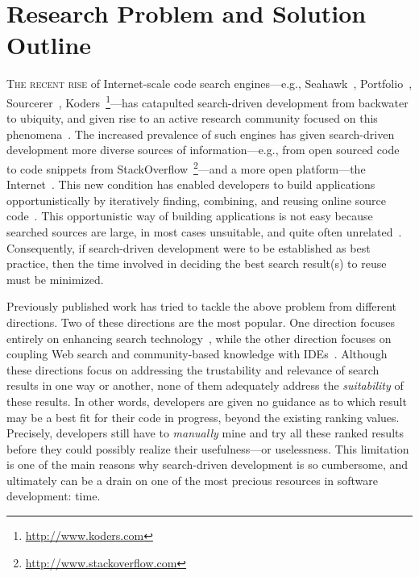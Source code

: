 \documentclass[conference]{IEEEtran}
\begin{document}
\section{Research Problem and Solution Outline}
\label{sec:intro}
\lettrine[lraise=0.1, nindent=0em, slope=-.5em]{T} {he recent rise} of Internet-scale code search engines---e.g., Seahawk~\cite{Bacchelli:2012dl}, Portfolio~\cite{McMillan:2011wq}, Sourcerer~\cite{Bajracharya:2006vn}, Koders~\footnote{\url{http://www.koders.com}}---has catapulted search-driven development from backwater to ubiquity, and given rise to an active research community focused on this phenomena~\cite{Bajracharya:2009fj, Bajracharya:2010iy, Bajracharya:2011kw}. The increased prevalence of such engines has given search-driven development more diverse sources of information---e.g., from open sourced code to code snippets from StackOverflow~\footnote{\url{http://www.stackoverflow.com}}---and a more open platform---the Internet~\cite{GallardoValencia:2009gr, GallardoValencia:2010ij, Ying:2012tr}. This new condition has enabled developers to build applications opportunistically by iteratively finding, combining, and reusing online source code~\cite{Brandt:2008wi, Brandt:2009jb, Ying:2012tr}. This opportunistic way of building applications is not easy because searched sources are large, in most cases unsuitable, and quite often unrelated~\cite{GallardoValencia:2009gr}. Consequently, if search-driven development were to be established as best practice, then the time involved in deciding the best search result(s) to reuse must be minimized.

Previously published work has tried to tackle the above problem from different directions. Two of these directions are the most popular. One direction focuses entirely on enhancing search technology~\cite{Bajracharya:2010um, Gysin:2010kt, Mandelin:2005uj, McMillan:2011cm, McMillan:2012dj}, while the other direction focuses on coupling Web search and community-based knowledge with IDEs~\cite{Bacchelli:2012dl, Brandt:2010tp, Hartmann:2010hx, Hoffmann:2007wo, Wightman:2012gc}. Although these directions focus on addressing the trustability and relevance of search results in one way or another, none of them adequately address the \emph{suitability} of these results. In other words, developers are given no guidance as to which result may be a best fit for their code in progress, beyond the existing ranking values. Precisely, developers still have to \emph{manually} mine and try all these ranked results before they could possibly realize their usefulness---or uselessness. This limitation is one of the main reasons why search-driven development is so cumbersome, and ultimately can be a drain on one of the most precious resources in software development: time. 
\end{document}
